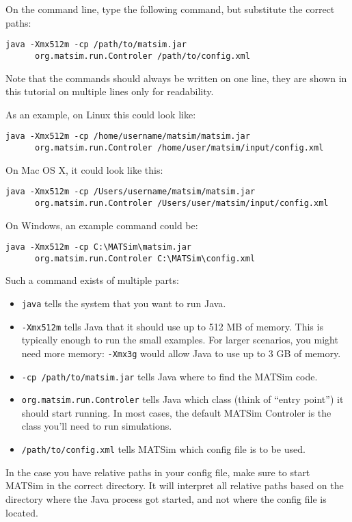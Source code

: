 On the command line, type the following command, but substitute the correct
paths:
\begin{verbatim}
java -Xmx512m -cp /path/to/matsim.jar
      org.matsim.run.Controler /path/to/config.xml
\end{verbatim}
Note that the commands should always be written on one line, they are shown in
this tutorial on multiple lines only for readability.

As an example, on Linux this could look like:
\begin{verbatim}
java -Xmx512m -cp /home/username/matsim/matsim.jar 
      org.matsim.run.Controler /home/user/matsim/input/config.xml
\end{verbatim}

On Mac OS X, it could look like this:
\begin{verbatim}
java -Xmx512m -cp /Users/username/matsim/matsim.jar 
      org.matsim.run.Controler /Users/user/matsim/input/config.xml
\end{verbatim}

On Windows, an example command could be:
\begin{verbatim}
java -Xmx512m -cp C:\MATSim\matsim.jar 
      org.matsim.run.Controler C:\MATSim\config.xml
\end{verbatim}

Such a command exists of multiple parts:
\begin{itemize}
  \item {\tt java} tells the system that you want to run Java.
  \item {\tt -Xmx512m} tells Java that it should use up to 512 MB of memory.
  This is typically enough to run the small examples. For larger scenarios, you
  might need more memory: {\tt -Xmx3g} would allow Java to use up to 3 GB of
  memory.
  \item {\tt -cp /path/to/matsim.jar} tells Java where to find the MATSim code.
  \item {\tt org.matsim.run.Controler} tells Java which class (think of ``entry
  point'') it should start running. In most cases, the default MATSim Controler
  is the class you'll need to run simulations.
  \item {\tt /path/to/config.xml} tells MATSim which config file is to be used.
\end{itemize}

In the case you have relative paths in your config file, make sure to start
MATSim in the correct directory. It will interpret all relative paths based on
the directory where the Java process got started, and not where the config file
is located.

